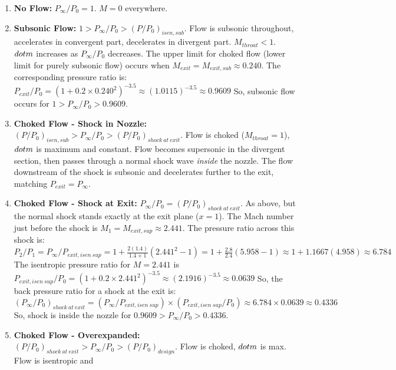 \begin{itemize}
  \begin{enumerate}
  \def\labelenumi{\alph{enumi}.}
  \tightlist
  \item
    \textbf{No Flow:} \(P_{\infty} / P_0 = 1\). \(M=0\) everywhere.
  \item
    \textbf{Subsonic Flow:}
    \(1 > P_{\infty} / P_0 > (P/P_0)_{isen, sub}\). Flow is subsonic
    throughout, accelerates in convergent part, decelerates in divergent
    part. \(M_{throat} < 1\). \(\\dot{m}\) increases as
    \(P_{\infty}/P_0\) decreases. The upper limit for choked flow (lower
    limit for purely subsonic flow) occurs when
    \(M_{exit} = M_{exit, sub} \approx 0.240\). The corresponding
    pressure ratio is:
    \(P_{exit}/P_0 = (1 + 0.2 \times 0.240^2)^{-3.5} \approx (1.0115)^{-3.5} \approx 0.9609\)
    So, subsonic flow occurs for \(1 > P_{\infty} / P_0 > 0.9609\).
  \item
    \textbf{Choked Flow - Shock in Nozzle:}
    \((P/P_0)_{isen, sub} > P_{\infty} / P_0 > (P/P_0)_{shock\ at\ exit}\).
    Flow is choked (\(M_{throat}=1\)), \(\\dot{m}\) is maximum and
    constant. Flow becomes supersonic in the divergent section, then
    passes through a normal shock wave \emph{inside} the nozzle. The
    flow downstream of the shock is subsonic and decelerates further to
    the exit, matching \(P_{exit} = P_{\infty}\).
  \item
    \textbf{Choked Flow - Shock at Exit:}
    \(P_{\infty} / P_0 = (P/P_0)_{shock\ at\ exit}\). As above, but the
    normal shock stands exactly at the exit plane (\(x=1\)). The Mach
    number just before the shock is
    \(M_1 = M_{exit, sup} \approx 2.441\). The pressure ratio across
    this shock is:
    \(P_2/P_1 = P_{\infty}/P_{exit, isen\ sup} = 1 + \frac{2(1.4)}{1.4+1}(2.441^2 - 1) = 1 + \frac{2.8}{2.4}(5.958 - 1) \approx 1 + 1.1667(4.958) \approx 6.784\)
    The isentropic pressure ratio for \(M=2.441\) is
    \(P_{exit, isen\ sup}/P_0 = (1 + 0.2 \times 2.441^2)^{-3.5} \approx (2.1916)^{-3.5} \approx 0.0639\)
    So, the back pressure ratio for a shock at the exit is:
    \((P_{\infty} / P_0)_{shock\ at\ exit} = (P_{\infty}/P_{exit, isen\ sup}) \times (P_{exit, isen\ sup}/P_0) \approx 6.784 \times 0.0639 \approx 0.4336\)
    So, shock is inside the nozzle for
    \(0.9609 > P_{\infty} / P_0 > 0.4336\).
  \item
    \textbf{Choked Flow - Overexpanded:}
    \((P/P_0)_{shock\ at\ exit} > P_{\infty} / P_0 > (P/P_0)_{design}\).
    Flow is choked, \(\\dot{m}\) is max. Flow is isentropic and

\end{enumerate}
\end{itemize}
